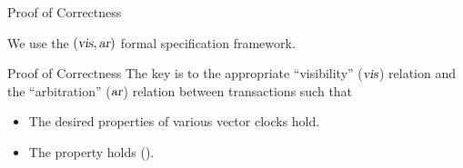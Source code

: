 
\begin{frame}{Proof of Correctness}
  \begin{center}
    We use the $(\textsl{vis}, \textsl{ar})$ formal specification framework.

    \vspace{0.60cm}
  \end{center}
\end{frame}

\begin{frame}{Proof of Correctness}
  The key is to  the appropriate ``visibility'' ($\textsl{vis}$) relation
  and the ``arbitration'' ($\textsl{ar}$) relation between transactions such that \\[10pt]

  \begin{itemize}
    \setlength{\itemsep}{8pt}
    \item The desired properties of various vector clocks hold.
    \item The  property holds ().
  \end{itemize}
\end{frame}
